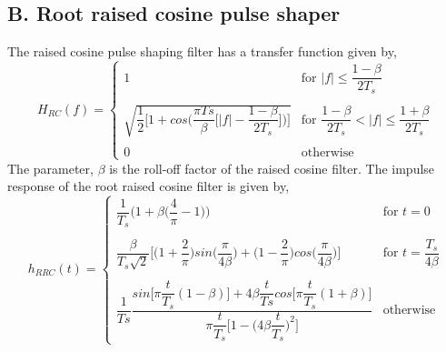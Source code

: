 \subsection*{B. Root raised cosine pulse shaper}
The raised cosine pulse shaping filter has a transfer function given by,
\begin{equation}
H_{RC}(f) = \begin{cases}
1 &\text{for $|f|\leq \dfrac{1-\beta}{2T_s}$}\\ \\
  \sqrt{\dfrac{1}{2} \bigg[1 + cos\bigg(\dfrac{\pi Ts}{\beta}\bigg[|f|- \dfrac{1-\beta}{2T_s} \bigg]\bigg)\bigg]} &\text{for $\dfrac{1-\beta}{2T_s}<|f|\leq\dfrac{1+\beta}{2T_s}$}\\ \\
0 & \text{otherwise}
\end{cases}
\end{equation}
The parameter, $\beta$ is the roll-off factor of the raised cosine filter. The impulse response of the root raised cosine filter is given by,
\begin{equation}
h_{RRC}(t) = \begin{cases}
	\dfrac{1}{T_s}\bigg(1+\beta\big(\dfrac{4}{\pi}-1\big)\bigg) &\text{for $t = 0$}\\ \\
	\dfrac{\beta}{T_s \sqrt{2}}\bigg[ \bigg(1+\dfrac{2}{\pi} \bigg) sin\bigg(\dfrac{\pi}{4 \beta}\bigg) + \bigg(1-\dfrac{2}{\pi} \bigg) cos\bigg(\dfrac{\pi}{4 \beta}\bigg)  \bigg]  	&\text{for $t=\dfrac{T_s}{4 \beta}$}\\ \\
	\dfrac{1}{Ts}\dfrac{sin \bigg[\pi\dfrac{t}{T_s}(1-\beta)\bigg] + 4\beta\dfrac{t}{Ts}cos \bigg[\pi\dfrac{t}{T_s}(1+\beta)\bigg] }{\pi\dfrac{t}{T_s}\bigg[1-\bigg(4\beta \dfrac{t}{T_s}\bigg)^2\bigg]} & \text{otherwise}
\end{cases}
\end{equation}

